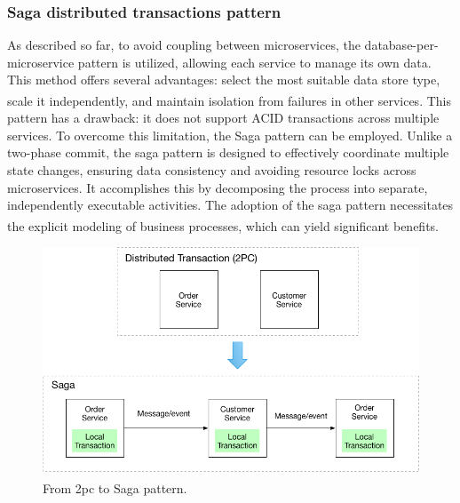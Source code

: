 \subsubsection{Saga distributed transactions pattern}
As described so far, to avoid coupling between microservices, the database-per-microservice pattern
is utilized, allowing each service to manage its own data. This method offers several advantages:
select the most suitable data store type, scale it independently, and maintain isolation from
failures in other services\textsuperscript{\cite{ms_sagas}}. This pattern has a drawback: it does
not support ACID transactions across multiple services. To overcome this limitation, the Saga
pattern can be employed.
\newline\newline
Unlike a two-phase commit, the saga pattern is designed to effectively coordinate multiple state
changes, ensuring data consistency and avoiding resource locks across microservices. It accomplishes
this by decomposing the process into separate, independently executable activities. The adoption of
the saga pattern necessitates the explicit modeling of business processes, which can yield
significant benefits\textsuperscript{\cite{microservices_book}}.

\begin{figure}
    \centering
    \includegraphics[scale=0.5]{Pictures/3_saga.png}
    \caption{From 2pc to Saga pattern\textsuperscript{\cite{io_sagas}}.}
    \label{fig:3_saga}
\end{figure}

